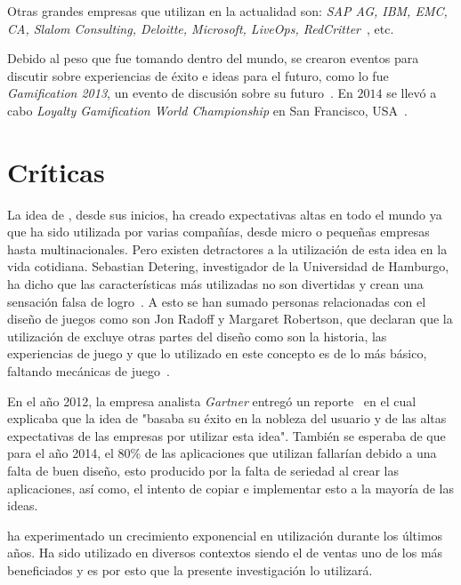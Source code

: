 Otras grandes empresas que utilizan {\gam} en la actualidad son:
\emph{SAP AG, IBM, EMC, CA, Slalom Consulting, Deloitte, Microsoft, LiveOps,
RedCritter}~\cite{Gam:Companies:1}, etc.

Debido al peso que {\gam} fue tomando dentro del mundo,
se crearon eventos para discutir sobre experiencias de éxito e ideas para
el futuro, como lo fue \emph{Gamification 2013},
un evento de discusión sobre su futuro~\cite{Gam:Events:1}.
En $2014$ se llevó a cabo \emph{Loyalty Gamification World Championship}
en San Francisco, USA~\cite{Gam:Events:2}. 

\section{Críticas}

La idea de {\gam}, desde sus inicios, ha creado expectativas altas en todo el mundo
ya que ha sido utilizada por varias compañías, desde micro o pequeñas empresas
hasta multinacionales.
Pero existen detractores a la utilización de esta idea en la vida cotidiana.
Sebastian Detering, investigador de la Universidad de Hamburgo, ha dicho que las
características más utilizadas no son divertidas y crean una sensación falsa de
logro~\cite{Gam:Crit:1}.
A esto se han sumado personas relacionadas con el diseño de juegos como son
Jon Radoff y Margaret Robertson,  que declaran que la utilización de {\gam}
excluye otras partes del diseño como son la historia, las experiencias de juego
y que lo utilizado en este concepto es de lo más básico, faltando mecánicas de
juego~\cite{Gam:Crit:2}.

En el año 2012, la empresa analista \emph{Gartner} entregó un
reporte~\cite{Gam:Crit:3} en el cual explicaba que la idea de {\gam}
"basaba su éxito en la nobleza del usuario y de las altas expectativas
de las empresas por utilizar esta idea".
También se esperaba de que para el año 2014, el 80\% de las aplicaciones
que utilizan {\gam} fallarían debido a una falta de buen diseño,
esto producido por la falta de seriedad al crear las aplicaciones,
así como, el intento de copiar e implementar esto a la mayoría de las ideas.

{\GAM} ha experimentado un crecimiento exponencial en utilización durante los últimos 
años. Ha sido utilizado en diversos contextos siendo el de ventas uno de los más beneficiados
 y es por esto que la presente investigación lo utilizará.
